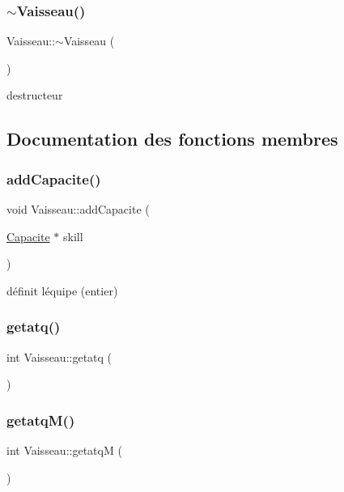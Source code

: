 \subsubsection{\texorpdfstring{$\sim$\+Vaisseau()}{~Vaisseau()}}
{\footnotesize\ttfamily Vaisseau\+::$\sim$\+Vaisseau (\begin{DoxyParamCaption}{ }\end{DoxyParamCaption})}



destructeur 



\subsection{Documentation des fonctions membres}
\mbox{\label{class_vaisseau_a04d7069231187e7dba26a06a0aaf2508}} 
\subsubsection{\texorpdfstring{add\+Capacite()}{addCapacite()}}
{\footnotesize\ttfamily void Vaisseau\+::add\+Capacite (\begin{DoxyParamCaption}\item[{\hyperlink{class_capacite}{Capacite} $\ast$}]{skill }\end{DoxyParamCaption})}



définit l\textquotesingle{}équipe (entier) 

\mbox{\label{class_vaisseau_a03d9f614943176d1e1d71d99f9d7f465}} 
\subsubsection{\texorpdfstring{getatq()}{getatq()}}
{\footnotesize\ttfamily int Vaisseau\+::getatq (\begin{DoxyParamCaption}{ }\end{DoxyParamCaption})}

\mbox{\label{class_vaisseau_a893c8a6199e3e79460891fafb0b16fba}} 
\subsubsection{\texorpdfstring{getatq\+M()}{getatqM()}}
{\footnotesize\ttfamily int Vaisseau\+::getatqM (\begin{DoxyParamCaption}{ }\end{DoxyParamCaption})}

